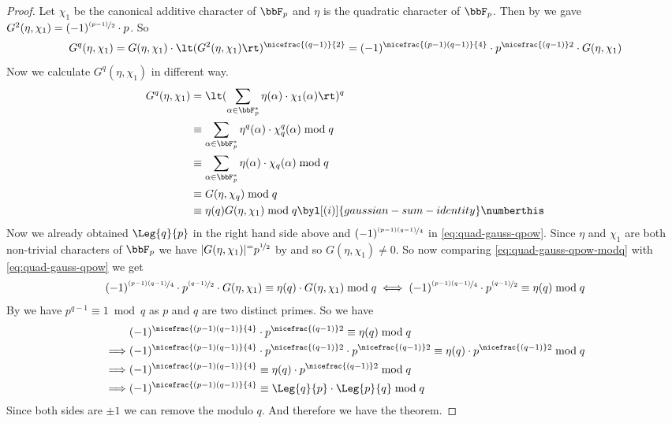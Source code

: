 \begin{proof}
  Let $\chi_1$ be the canonical additive character of $\bbF_p$ and $\eta$ is the quadratic character of $\bbF_p$. Then by \GSidentitieslem[(iv)] we gave $G^2(\eta,\chi_1)=(-1)^{\nicefrac{(p-1)}2}\cdot p$. So \begin{equation}\label{eq:quad-gauss-qpow}
    G^q(\eta,\chi_1)= G(\eta,\chi_1)\cdot \lt( G^2(\eta,\chi_1)\rt)^{\nicefrac{(q-1)}{2}}=(-1)^{\nicefrac{(p-1)(q-1)}{4}}\cdot p^{\nicefrac{(q-1)}2}\cdot G(\eta,\chi_1)
  \end{equation}Now we calculate $G^q(\eta,\chi_1)$ in different way. \begin{align*}
    G^q(\eta,\chi_1) & =\lt(\sum_{\alpha\in\bbF_p^*}\eta(\alpha)\cdot \chi_1(\alpha)\rt)^q\\ 
    & \equiv \sum_{\alpha\in\bbF_p^*}\eta^q(\alpha)\cdot \chi_q^q(\alpha)\bmod{q}\\ 
    & \equiv \sum_{\alpha\in\bbF_p^*}\eta(\alpha)\cdot \chi_q(\alpha)\bmod{q}\\ 
    & \equiv G(\eta,\chi_q)\bmod{q}\\ 
    & \equiv \eta(q)G(\eta,\chi_1)\bmod{q}\byl[(i)]{gaussian-sum-identity}\numberthis\label{eq:quad-gauss-qpow-modq}
  \end{align*}
  Now we already obtained $\Leg{q}{p}$ in the right hand side above and $(-1)^{\nicefrac{(p-1)(q-1)}{4}}$ in \eqref{eq:quad-gauss-qpow}. Since $\eta$ and $\chi_1$ are both non-trivial characters of $\bbF_p$ we have $|G(\eta,\chi_1)|^=p^{\nicefrac12}$  by \GSpropthm and so $G(\eta,\chi_1)\neq 0$. So now comparing \eqref{eq:quad-gauss-qpow-modq} with \eqref{eq:quad-gauss-qpow} we get \begin{align*}
    (-1)^{\nicefrac{(p-1)(q-1)}{4}}\cdot p^{\nicefrac{(q-1)}2}\cdot G(\eta,\chi_1) \equiv \eta(q)\cdot G(\eta,\chi_1)\bmod q   \iff  (-1)^{\nicefrac{(p-1)(q-1)}{4}}\cdot p^{\nicefrac{(q-1)}2}\equiv \eta(q)\bmod q
  \end{align*}
  By \FLTthm we have $p^{q-1}\equiv 1\bmod q$ as $p$ and $q$ are two distinct primes. So we have \begin{align*}
    & (-1)^{\nicefrac{(p-1)(q-1)}{4}}\cdot p^{\nicefrac{(q-1)}2}\equiv \eta(q)\bmod q\\ 
    \implies & (-1)^{\nicefrac{(p-1)(q-1)}{4}}\cdot p^{\nicefrac{(q-1)}2}\cdot p^{\nicefrac{(q-1)}2}\equiv \eta(q)\cdot p^{\nicefrac{(q-1)}2}\bmod q\\ 
    \implies & (-1)^{\nicefrac{(p-1)(q-1)}{4}}\equiv \eta(q)\cdot p^{\nicefrac{(q-1)}2}\bmod q\\ 
    \implies & (-1)^{\nicefrac{(p-1)(q-1)}{4}}\equiv \Leg{q}{p}\cdot \Leg{p}{q}\bmod q
  \end{align*}Since both sides are $\pm1$ we can remove the modulo $q$. And therefore we have the theorem. 
\end{proof}